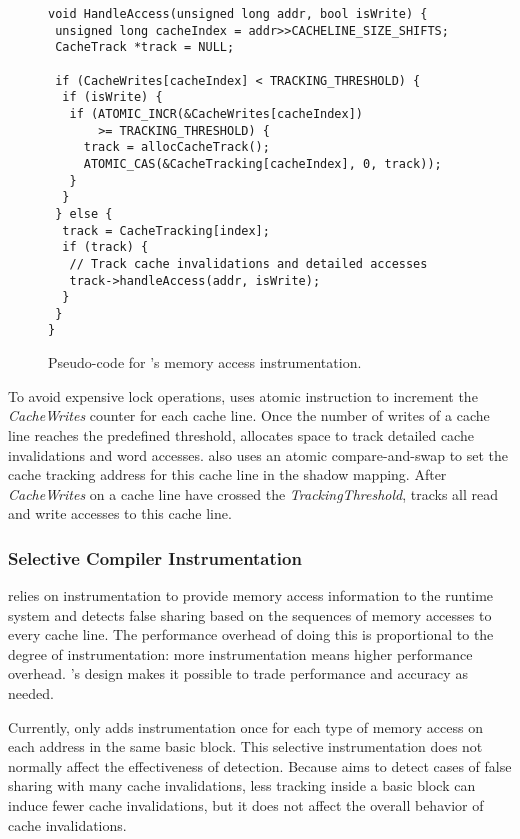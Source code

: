 \begin{figure}[!t]
\begin{lstlisting}
void HandleAccess(unsigned long addr, bool isWrite) {
 unsigned long cacheIndex = addr>>CACHELINE_SIZE_SHIFTS;
 CacheTrack *track = NULL;

 if (CacheWrites[cacheIndex] < TRACKING_THRESHOLD) {
  if (isWrite) {
   if (ATOMIC_INCR(&CacheWrites[cacheIndex]) 
       >= TRACKING_THRESHOLD) {
     track = allocCacheTrack();
     ATOMIC_CAS(&CacheTracking[cacheIndex], 0, track));
   }
  } 
 } else {
  track = CacheTracking[index];
  if (track) {
   // Track cache invalidations and detailed accesses
   track->handleAccess(addr, isWrite);
  }
 }
}
\end{lstlisting}
\caption{Pseudo-code for \Predator{}'s memory access instrumentation.\label{fig:algorithm}}
\end{figure}

To avoid expensive lock operations, \Predator{} uses atomic instruction to increment 
the {\it CacheWrites} counter for each cache line. 
Once the number of writes of a cache line reaches the predefined threshold,
\Predator{} allocates space to track detailed cache invalidations and word accesses.
\Predator{} also 
uses an atomic compare-and-swap to set the cache tracking address for this cache line in
the shadow mapping.
After {\it CacheWrites} on a cache line have crossed the {\it TrackingThreshold}, 
\Predator{} tracks all read and write accesses to this cache line.


\subsubsection{Selective Compiler Instrumentation}
\label{sec:selectinstrumentation}

\Predator{} relies on instrumentation to provide memory access information to the runtime system 
and detects false sharing based on the sequences of memory accesses to every cache line. 
The performance overhead of doing this is proportional to 
the degree of instrumentation: more 
instrumentation means higher performance overhead. \Predator{}'s design makes it possible to trade performance and accuracy as needed.

Currently, \Predator{} only adds instrumentation once for each type of memory access on each address 
in the same basic block. 
This selective instrumentation does not normally affect the effectiveness of detection. 
Because \Predator{} aims to detect cases of false sharing with many cache invalidations,
less tracking inside a basic block can induce fewer cache invalidations, 
but it does not affect the overall behavior of cache invalidations. 

